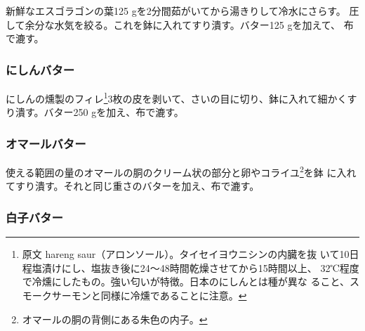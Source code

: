 \begin{recette}
新鮮なエスゴラゴンの葉125 gを2分間茹がいてから湯きりして冷水にさらす。
圧して余分な水気を絞る。これを鉢に入れてすり潰す。バター125 gを加えて、
布で漉す。

\maeaki

\hypertarget{beurre-de-hereng}{%
\subsubsection{にしんバター}\label{beurre-de-hereng}}



にしんの燻製のフィレ\footnote{原文 hareng
  saur（アロンソール）。タイセイヨウニシンの内臓を抜
  いて10日程塩漬けにし、塩抜き後に24〜48時間乾燥させてから15時間以上、
  32℃程度で冷燻にしたもの。強い匂いが特徴。日本のにしんとは種が異な
  ること、スモークサーモンと同様に冷燻であることに注意。}3枚の皮を剥いて、さいの目に切り、鉢に入れて細かくすり潰す。バター250
gを加え、布で漉す。

\maeaki

\hypertarget{beurre-de-homard}{%
\subsubsection{オマールバター}\label{beurre-de-homard}}



使える範囲の量のオマールの胴のクリーム状の部分と卵やコライユ\footnote{オマールの胴の背側にある朱色の内子。}を鉢
に入れてすり潰す。それと同じ重さのバターを加え、布で漉す。

\maeaki

\hypertarget{beurre-de-laitance}{%
\subsubsection{白子バター}\label{beurre-de-laitance}}


\end{recette}
